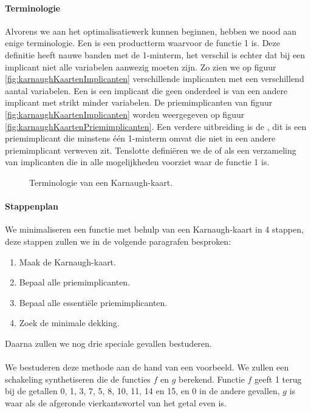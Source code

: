 \paragraph{Terminologie} Alvorens we aan het optimalisatiewerk kunnen beginnen, hebben we nood aan enige terminologie. Een  is een productterm waarvoor de functie 1 is. Deze definitie heeft nauwe banden met de 1-minterm, het verschil is echter dat bij een implicant niet alle variabelen aanwezig moeten zijn. Zo zien we op figuur \ref{fig:karnaughKaartenImplicanten} verschillende implicanten met een verschillend aantal variabelen. Een  is een implicant die geen onderdeel is van een andere implicant met strikt minder variabelen. De priemimplicanten van figuur \ref{fig:karnaughKaartenImplicanten} worden weergegeven op figuur \ref{fig:karnaughKaartenPriemimplicanten}. Een verdere uitbreiding is de , dit is een priemimplicant die minstens \'e\'en 1-minterm omvat die niet in een andere priemimplicant verweven zit. Tenslotte defini\"eren we de  of  als een verzameling van implicanten die in alle mogelijkheden voorziet waar de functie 1 is.
\begin{figure}[hbt]
\centering
{}
\caption{Terminologie van een Karnaugh-kaart.}
\end{figure}
\paragraph{Stappenplan}
We minimaliseren een functie met behulp van een Karnaugh-kaart in 4 stappen, deze stappen zullen we in de volgende paragrafen besproken:
\begin{enumerate}
 \item Maak de Karnaugh-kaart.
 \item Bepaal alle priemimplicanten.
 \item Bepaal alle essenti\"ele priemimplicanten.
 \item Zoek de minimale dekking.
\end{enumerate}
Daarna zullen we nog drie speciale gevallen bestuderen.
\paragraph{}
We bestuderen deze methode aan de hand van een voorbeeld. We zullen een schakeling synthetiseren die de functies $f$ en $g$ berekend. Functie $f$ geeft 1 terug bij de getallen 0, 1, 3, 7, 5, 8, 10, 11, 14 en 15, en 0 in de andere gevallen, $g$ is waar  als de afgeronde vierkantswortel van het getal even is.
